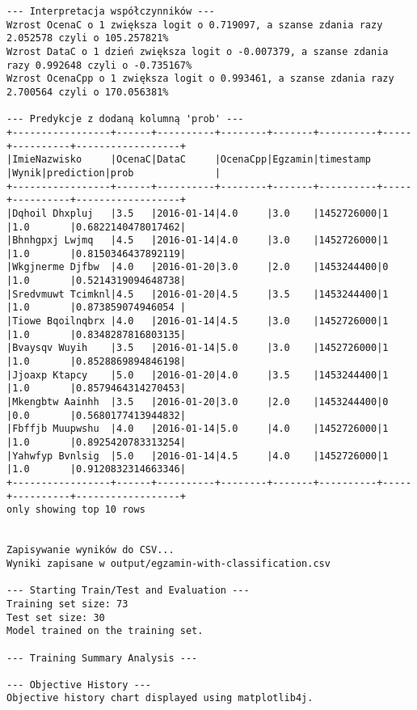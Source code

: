 \documentclass{article}
\begin{document}
\begin{verbatim}
--- Interpretacja współczynników ---
Wzrost OcenaC o 1 zwiększa logit o 0.719097, a szanse zdania razy 2.052578 czyli o 105.257821%
Wzrost DataC o 1 dzień zwiększa logit o -0.007379, a szanse zdania razy 0.992648 czyli o -0.735167%
Wzrost OcenaCpp o 1 zwiększa logit o 0.993461, a szanse zdania razy 2.700564 czyli o 170.056381%

--- Predykcje z dodaną kolumną 'prob' ---
+-----------------+------+----------+--------+-------+----------+-----+----------+------------------+
|ImieNazwisko     |OcenaC|DataC     |OcenaCpp|Egzamin|timestamp |Wynik|prediction|prob              |
+-----------------+------+----------+--------+-------+----------+-----+----------+------------------+
|Dqhoil Dhxpluj   |3.5   |2016-01-14|4.0     |3.0    |1452726000|1    |1.0       |0.6822140478017462|
|Bhnhgpxj Lwjmq   |4.5   |2016-01-14|4.0     |3.0    |1452726000|1    |1.0       |0.8150346437892119|
|Wkgjnerme Djfbw  |4.0   |2016-01-20|3.0     |2.0    |1453244400|0    |1.0       |0.5214319094648738|
|Sredvmuwt Tcimknl|4.5   |2016-01-20|4.5     |3.5    |1453244400|1    |1.0       |0.873859074946054 |
|Tiowe Bqoilnqbrx |4.0   |2016-01-14|4.5     |3.0    |1452726000|1    |1.0       |0.8348287816803135|
|Bvaysqv Wuyih    |3.5   |2016-01-14|5.0     |3.0    |1452726000|1    |1.0       |0.8528869894846198|
|Jjoaxp Ktapcy    |5.0   |2016-01-20|4.0     |3.5    |1453244400|1    |1.0       |0.8579464314270453|
|Mkengbtw Aainhh  |3.5   |2016-01-20|3.0     |2.0    |1453244400|0    |0.0       |0.5680177413944832|
|Fbffjb Muupwshu  |4.0   |2016-01-14|5.0     |4.0    |1452726000|1    |1.0       |0.8925420783313254|
|Yahwfyp Bvnlsig  |5.0   |2016-01-14|4.5     |4.0    |1452726000|1    |1.0       |0.9120832314663346|
+-----------------+------+----------+--------+-------+----------+-----+----------+------------------+
only showing top 10 rows


Zapisywanie wyników do CSV...
Wyniki zapisane w output/egzamin-with-classification.csv

--- Starting Train/Test and Evaluation ---
Training set size: 73
Test set size: 30
Model trained on the training set.

--- Training Summary Analysis ---

--- Objective History ---
Objective history chart displayed using matplotlib4j.


\end{verbatim}
\end{document}
